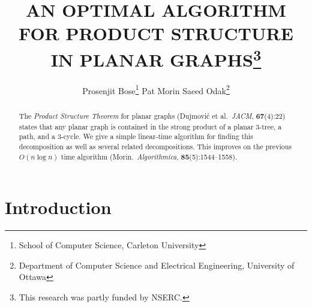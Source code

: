 \documentclass{patmorin}
\title{\MakeUppercase{An Optimal Algorithm for Product Structure in Planar Graphs}\thanks{This research was partly funded by NSERC.}}
\author{%
  Prosenjit Bose\thanks{School of Computer Science, Carleton University}\qquad
  Pat Morin\footnotemark[1]\qquad
  Saeed Odak\thanks{Department of Computer Science and Electrical Engineering, University of Ottawa}}
\date{}
\begin{document}
\maketitle

\begin{abstract}
  The \emph{Product Structure Theorem} for planar graphs (Dujmović et al.\ \emph{JACM}, \textbf{67}(4):22) states that any planar graph is contained in the strong product of a planar $3$-tree, a path, and a $3$-cycle.  We give a simple linear-time algorithm for finding this decomposition as well as several related decompositions.  This improves on the previous $O(n\log n)$ time algorithm (Morin.\ \emph{Algorithmica}, \textbf{85}(5):1544--1558).
\end{abstract}

%

\section{Introduction}
\end{document}
